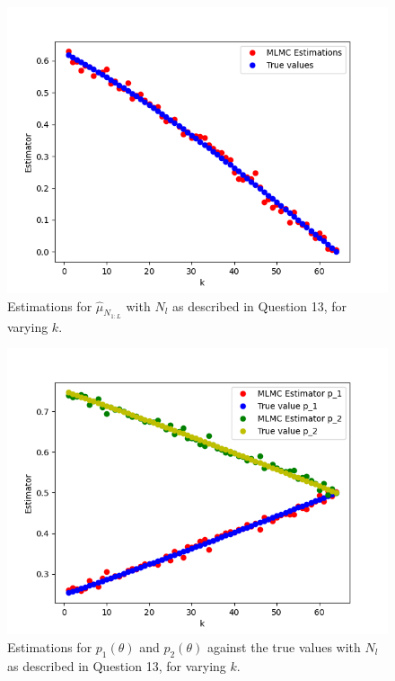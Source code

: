 \documentclass{article}
\begin{document}
\begin{figure}
\begin{center}
\includegraphics[width=0.85\linewidth]{Question 13 (a).png}
\caption{Estimations for $\hat\mu_{N_{1:L}}$ with $N_l $ as described in Question 13, for varying $k$.}
\label{fig:Q13 Estimators}
\end{center}
\end{figure}

\begin{figure}
\begin{center}
\includegraphics[width=0.85\linewidth]{Question 13 (b).png}
\caption{Estimations for $p_1(\theta)$ and $p_2(\theta)$ against the true values with $N_l $ as described in Question 13, for varying $k$.}
\label{fig:Q13 Estimators2}
\end{center}
\end{figure}
\end{document}

